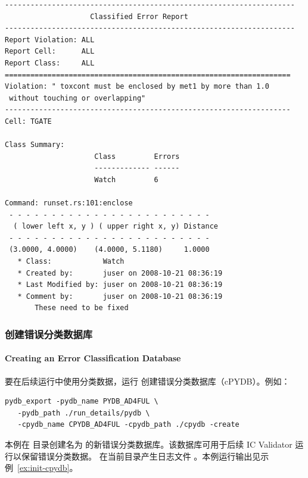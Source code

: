 \begin{lstlisting}[style=shell,caption={已分类错误报告中的错误记录},label={ex:classified-err-rec}]
--------------------------------------------------------------------
                    Classified Error Report
--------------------------------------------------------------------
Report Violation: ALL
Report Cell:      ALL
Report Class:     ALL
===================================================================
Violation: " toxcont must be enclosed by met1 by more than 1.0
 without touching or overlapping"
-------------------------------------------------------------------
Cell: TGATE

Class Summary:
                     Class         Errors
                     ------------- ------
                     Watch         6

Command: runset.rs:101:enclose
 - - - - - - - - - - - - - - - - - - - - - - - -
  ( lower left x, y ) ( upper right x, y) Distance
 - - - - - - - - - - - - - - - - - - - - - - - -
 (3.0000, 4.0000)    (4.0000, 5.1180)     1.0000
   * Class:            Watch
   * Created by:       juser on 2008-10-21 08:36:19
   * Last Modified by: juser on 2008-10-21 08:36:19
   * Comment by:       juser on 2008-10-21 08:36:19
       These need to be fixed
\end{lstlisting}

\subsubsection{创建错误分类数据库}
\paragraph*{Creating an Error Classification Database}

要在后续运行中使用分类数据，运行  创建错误分类数据库（cPYDB）。例如：
\begin{lstlisting}[style=shell]
pydb_export -pydb_name PYDB_AD4FUL \
   -pydb_path ./run_details/pydb \
   -cpydb_name CPYDB_AD4FUL -cpydb_path ./cpydb -create
\end{lstlisting}

本例在  目录创建名为  的新错误分类数据库。该数据库可用于后续 IC Validator 运行以保留错误分类数据。
 在当前目录产生日志文件 。本例运行输出见示例~\ref{ex:init-cpydb}。

